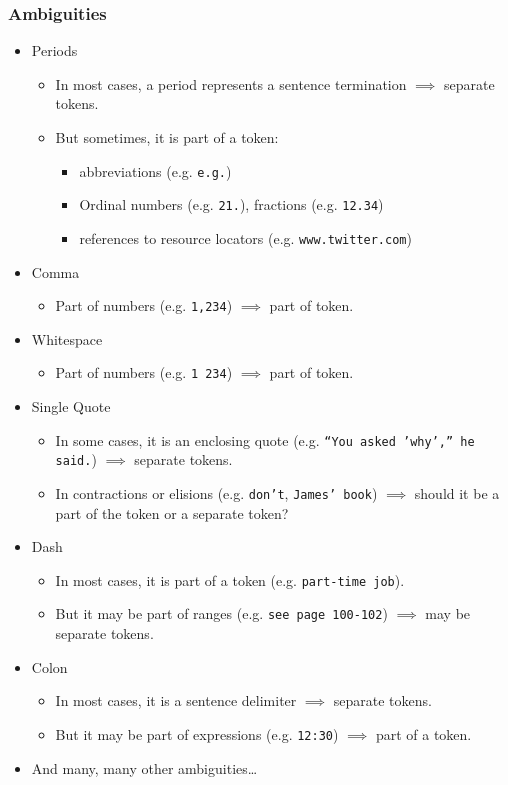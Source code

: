 			\subsubsection{Ambiguities} %
				\begin{itemize}
					\item Periods
						\begin{itemize}
							\item In most cases, a period represents a sentence termination \( \implies \) separate tokens.
							\item But sometimes, it is part of a token:
								\begin{itemize}
									\item abbreviations (e.g. \texttt{e.g.})
									\item Ordinal numbers (e.g. \texttt{21.}), fractions (e.g. \texttt{12.34})
									\item references to resource locators (e.g. \texttt{www.twitter.com})
								\end{itemize}
						\end{itemize}
					\item Comma
						\begin{itemize}
							\item Part of numbers (e.g. \texttt{1,234}) \( \implies \) part of token.
						\end{itemize}
					\item Whitespace
						\begin{itemize}
							\item Part of numbers (e.g. \texttt{1 234}) \( \implies \) part of token.
						\end{itemize}
					\item Single Quote
						\begin{itemize}
							\item In some cases, it is an enclosing quote (e.g. \texttt{\enquote{You asked 'why',} he said.}) \(\implies\) separate tokens.
							\item In contractions or elisions (e.g. \texttt{don't}, \texttt{James' book}) \(\implies\) should it be a part of the token or a separate token?
						\end{itemize}
					\item Dash
						\begin{itemize}
							\item In most cases, it is part of a token (e.g. \texttt{part-time job}).
							\item But it may be part of ranges (e.g. \texttt{see page 100-102}) \(\implies\) may be separate tokens.
						\end{itemize}
					\item Colon
						\begin{itemize}
							\item In most cases, it is a sentence delimiter \(\implies\) separate tokens.
							\item But it may be part of expressions (e.g. \texttt{12:30}) \(\implies\) part of a token.
						\end{itemize}
					\item And many, many other ambiguities\dots
				\end{itemize}

